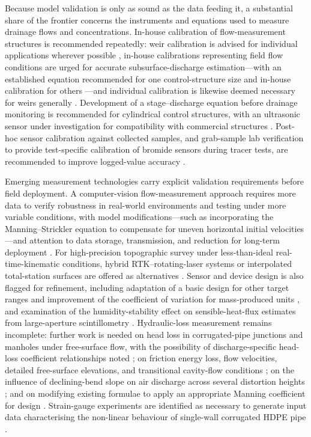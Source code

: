 Because model validation is only as sound as the data feeding it, a substantial share of the frontier concerns the instruments and equations used to measure drainage flows and concentrations. In-house calibration of flow-measurement structures is recommended repeatedly: weir calibration is advised for individual applications wherever possible \parencite{Christianson2019}, in-house calibrations representing field flow conditions are urged for accurate subsurface-discharge estimation---with an established equation recommended for one control-structure size and in-house calibration for others \parencite{Katuwal2024}---and individual calibration is likewise deemed necessary for weirs generally \parencite{Napierala2023}. Development of a stage--discharge equation before drainage monitoring is recommended for cylindrical control structures, with an ultrasonic sensor under investigation for compatibility with commercial structures \parencite{BinShokrana2021}. Post-hoc sensor calibration against collected samples, and grab-sample lab verification to provide test-specific calibration of bromide sensors during tracer tests, are recommended to improve logged-value accuracy \parencite{deOliveira2023b}.

Emerging measurement technologies carry explicit validation requirements before field deployment. A computer-vision flow-measurement approach requires more data to verify robustness in real-world environments and testing under more variable conditions, with model modifications---such as incorporating the Manning--Strickler equation to compensate for uneven horizontal initial velocities---and attention to data storage, transmission, and reduction for long-term deployment \parencite{Young2023}. For high-precision topographic survey under less-than-ideal real-time-kinematic conditions, hybrid RTK--rotating-laser systems or interpolated total-station surfaces are offered as alternatives \parencite{Freeland2014}. Sensor and device design is also flagged for refinement, including adaptation of a basic design for other target ranges and improvement of the coefficient of variation for mass-produced units \parencite{Enamorado2007}, and examination of the humidity-stability effect on sensible-heat-flux estimates from large-aperture scintillometry \parencite{Zhang2010}. Hydraulic-loss measurement remains incomplete: further work is needed on head loss in corrugated-pipe junctions and manholes under free-surface flow, with the possibility of discharge-specific head-loss coefficient relationships noted \parencite{Bayat2011}; on friction energy loss, flow velocities, detailed free-surface elevations, and transitional cavity-flow conditions \parencite{Nédélec2008}; on the influence of declining-bend slope on air discharge across several distortion heights \parencite{Gurklys2008}; and on modifying existing formulae to apply an appropriate Manning coefficient for design \parencite{Kouchakzadeh2011}. Strain-gauge experiments are identified as necessary to generate input data characterising the non-linear behaviour of single-wall corrugated HDPE pipe \parencite{Gaj2021}.

